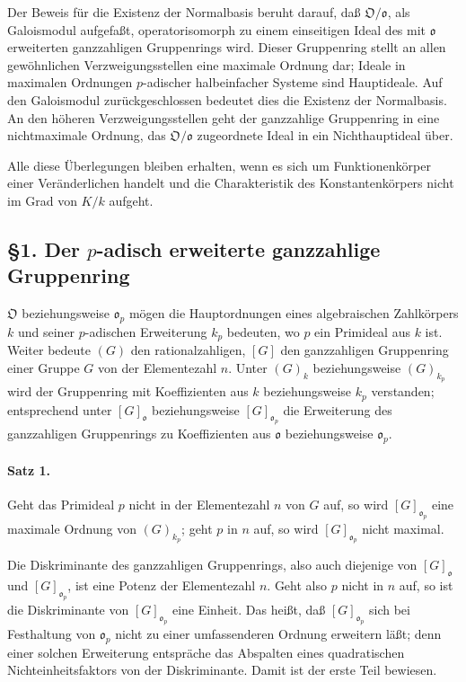 \documentclass[11pt]{article}
\providecommand{\frako}{\mathfrak o}
\providecommand{\frakO}{\mathfrak O}
\begin{document}
Der Beweis für die Existenz der Normalbasis beruht darauf, daß \(\frakO/\frako\), als Galoismodul aufgefaßt, operatorisomorph zu einem einseitigen Ideal des mit \(\frako\) erweiterten ganzzahligen Gruppenrings wird. Dieser Gruppenring stellt an allen gewöhnlichen Verzweigungsstellen eine maximale Ordnung dar; Ideale in maximalen Ordnungen \(p\)-adischer halbeinfacher Systeme sind Hauptideale. Auf den Galoismodul zurückgeschlossen bedeutet dies die Existenz der Normalbasis. An den höheren Verzweigungsstellen geht der ganzzahlige Gruppenring in eine nichtmaximale Ordnung, das \(\frakO/\frako\) zugeordnete Ideal in ein Nichthauptideal über.

Alle diese Überlegungen bleiben erhalten, wenn es sich um Funktionenkörper einer Veränderlichen handelt und die Charakteristik des Konstantenkörpers nicht im Grad von \(K/k\) aufgeht.

\subsection*{§1. Der \(p\)-adisch erweiterte ganzzahlige Gruppenring}

\(\frakO\) beziehungsweise \(\frako_p\) mögen die Hauptordnungen eines algebraischen Zahlkörpers \(k\) und seiner \(p\)-adischen Erweiterung \(k_p\) bedeuten, wo \(p\) ein Primideal aus \(k\) ist. Weiter bedeute \((G)\) den rationalzahligen, \([G]\) den ganzzahligen Gruppenring einer Gruppe \(G\) von der Elementezahl \(n\). Unter \((G)_k\) beziehungsweise \((G)_{k_p}\) wird der Gruppenring mit Koeffizienten aus \(k\) beziehungsweise \(k_p\) verstanden; entsprechend unter \([G]_{\frako}\) beziehungsweise \([G]_{\frako_p}\) die Erweiterung des ganzzahligen Gruppenrings zu Koeffizienten aus \(\frako\) beziehungsweise \(\frako_p\).

\paragraph{Satz 1.}
Geht das Primideal \(p\) nicht in der Elementezahl \(n\) von \(G\) auf, so wird \([G]_{\frako_p}\) eine maximale Ordnung von \((G)_{k_p}\); geht \(p\) in \(n\) auf, so wird \([G]_{\frako_p}\) nicht maximal.

Die Diskriminante des ganzzahligen Gruppenrings, also auch diejenige von \([G]_{\frako}\) und \([G]_{\frako_p}\), ist eine Potenz der Elementezahl \(n\). Geht also \(p\) nicht in \(n\) auf, so ist die Diskriminante von \([G]_{\frako_p}\) eine Einheit. Das heißt, daß \([G]_{\frako_p}\) sich bei Festhaltung von \(\frako_p\) nicht zu einer umfassenderen Ordnung erweitern läßt; denn einer solchen Erweiterung entspräche das Abspalten eines quadratischen Nichteinheitsfaktors von der Diskriminante. Damit ist der erste Teil bewiesen.
\end{document}

